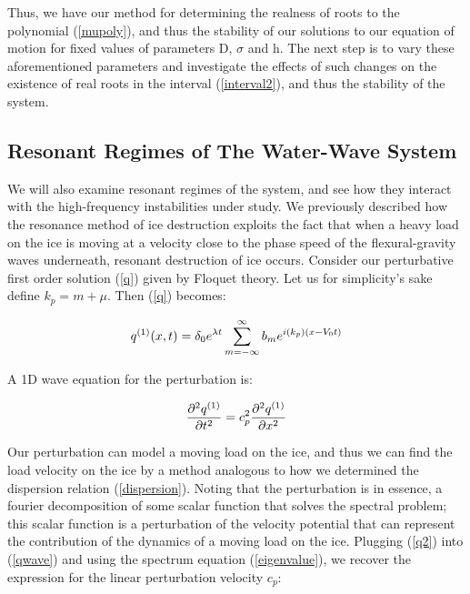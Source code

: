 \documentclass{article}
\begin{document}
\vspace{10}
Thus, we have our method for determining the realness of roots to the polynomial (\ref{mupoly}), and thus the stability of our solutions to our equation of motion for fixed values of parameters D, \(\sigma\) and h. The next step is to vary these aforementioned parameters and investigate the effects of such changes on the existence of real roots in the interval (\ref{interval2}), and thus the stability of the system. \\

\subsection{Resonant Regimes of The Water-Wave System}

We will also examine resonant regimes of the system, and see how they interact with the high-frequency instabilities under study. We previously described how the resonance method of ice destruction exploits the fact that when a heavy load on the ice is moving at a velocity close to the phase speed of the flexural-gravity waves underneath, resonant destruction of ice occurs. Consider our perturbative first order solution (\ref{q}) given by Floquet theory. Let us for simplicity's sake define \(k_{p} = m + \mu\). Then (\ref{q}) becomes:

\begin{equation} \label{q2}
  q^{(1)}(x,t) = \delta_{0}e^{\lambda t}\sum_{m=-\infty}^{\infty}b_{m}e^{i(k_{p})(x-V_{0}t)}
\\
\end{equation} 

A 1D wave equation for the perturbation is:

\begin{equation} \label{qwave}
  \frac{\partial^2{q^{(1)}}}{\partial{t}^2} = c_{p}^2 \frac{\partial^2{q^{(1)}}}{\partial{x}^2}
\\
\end{equation} 

Our perturbation can model a moving load on the ice, and thus we can find the load velocity on the ice by a method analogous to how we determined the dispersion relation (\ref{dispersion}). Noting that the perturbation is in essence, a fourier decomposition of some scalar function that solves the spectral problem; this scalar function is a perturbation of the velocity potential that can represent the contribution of the dynamics of a moving load on the ice. Plugging (\ref{q2}) into (\ref{qwave}) and using the spectrum equation (\ref{eigenvalue}), we recover the expression for the linear perturbation velocity \(c_{p}\): 
\end{document}
